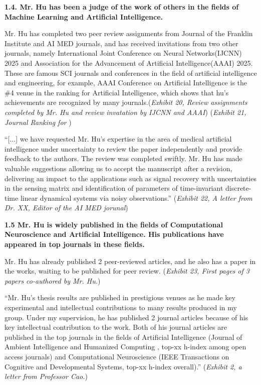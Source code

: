 \documentclass{article}
\begin{document}
{\bf 1.4. Mr. Hu has been a judge of the work of others in the fields of Machine Learning and Artificial Intelligence. }

Mr. Hu has completed two peer review assignments from Journal of the Franklin Institute and AI MED journals, and has received invitations from two other journals, namely International Joint Conference on Neural Networks(IJCNN) 2025 and Association for the Advancement of Artificial Intelligence(AAAI) 2025. These are famous SCI journals and conferences in the field of artificial intelligence and engineering, for example, AAAI Conference on Artificial Intelligence is the \#4 venue in the ranking for Artificial Intelligence, which shows that hu's achievements are recognized by many journals.({\it Exhibit 20, Review assignments completed by Mr. Hu and review invatation by IJCNN and AAAI}) ({\it Exhibit 21, Journal Ranking for })


“[...] we have requested Mr. Hu’s expertise in the area of medical artificial intelligence under uncertainty to review the paper independently and provide feedback to the authors. The review was completed swiftly. Mr. Hu has made valuable suggestions allowing us to accept the manuscript after a revision, delivering an impact to the applications such as signal recovery with uncertainties in the sensing matrix and identification of parameters of time-invariant discrete-time linear dynamical systems via noisy observations.” ({\it Exhibit 22, A letter from Dr. XX, Editor of the AI MED jorunal}) 


{\bf 1.5 Mr. Hu is widely published in the fields of Computational Neuroscience and Artificial Intelligence. His publications have appeared in top journals in these fields.}

Mr. Hu has already published 2 peer-reviewed articles, and he also has a paper in the works, waiting to be published for peer review. ({\it Exhibit 23, First pages of 3 papers co-authored by Mr. Hu.}) 

“Mr. Hu’s thesis results are published in prestigious venues as he made key experimental and intellectual contributions to many results produced in my group. Under my supervision, he has published 2 journal articles because of his key intellectual contribution to the work. Both of his journal articles are published in the top journals in the fields of Artificial Intelligence (Journal of Ambient Intelligence and Humanized Computing , top-xx h-index among open access journals) and Computational Neuroscience (IEEE Transactions on Cognitive and Developmental Systems, top-xx h-index overall).” ({\it Exhibit 2, a letter from Professor Cao.}) 
\end{document}
